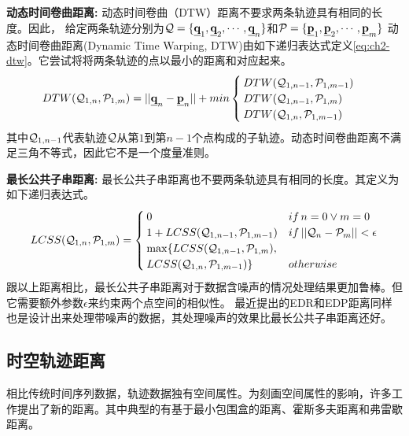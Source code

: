 \textbf{动态时间卷曲距离:}
动态时间卷曲（DTW）距离不要求两条轨迹具有相同的长度。因此，
给定两条轨迹分别为${\cal{Q}}=\{\emph{{\textbf{q}}}_{1},\emph{{\textbf{q}}}_{2},\cdots,\emph{{\textbf{q}}}_{n}\}$和${\cal{P}}=\{\emph{{\textbf{p}}}_1,\emph{{\textbf{p}}}_{2},\cdots,\emph{{\textbf{p}}}_{m}\}$
动态时间卷曲距离(Dynamic Time Warping, DTW)由如下递归表达式定义\ref{eq:ch2-dtw}。它尝试将将两条轨迹的点以最小的距离和对应起来。
\begin{equation}\label{eq:ch2-dtw}
DTW({\cal{Q}}_{1,n}, {\cal{P}}_{1,m})=||\emph{{\textbf{q}}}_{n}-\emph{{\textbf{p}}}_{n}||+min \begin{cases}
DTW({\cal{Q}}_{1,n-1}, {\cal{P}}_{1,m-1})  \\
DTW({\cal{Q}}_{1,n-1}, {\cal{P}}_{1,m})  \\
DTW({\cal{Q}}_{1,n}, {\cal{P}}_{1,m-1})
\end{cases}
\end{equation}
其中${\cal{Q}}_{1,n-1}$代表轨迹$\cal Q$从第$1$到第$n-1$个点构成的子轨迹。动态时间卷曲距离不满足三角不等式，因此它不是一个度量准则。

\textbf{最长公共子串距离:}
最长公共子串距离也不要两条轨迹具有相同的长度。其定义为如下递归表达式。
\begin{eqnarray}\label{eq:ch2-lcss}
LCSS({\cal{Q}}_{1,n}, {\cal{P}}_{1,m})= \begin{cases}
0 & if \, n=0 \lor m=0  \\
1+ LCSS({\cal{Q}}_{1,n-1}, {\cal{P}}_{1,m-1}) & if \,  ||{\cal{Q}}_{n}-{\cal{P}}_{m}||<\epsilon  \\
\max \{LCSS({\cal{Q}}_{1,n-1}, {\cal{P}}_{1,m}) ,\\LCSS({\cal{Q}}_{1,n}, {\cal{P}}_{1,m-1})\} & otherwise
\end{cases}
\end{eqnarray}
跟以上距离相比，最长公共子串距离对于数据含噪声的情况处理结果更加鲁棒。但它需要额外参数$\epsilon$来约束两个点空间的相似性。
最近提出的EDR和EDP距离同样也是设计出来处理带噪声的数据，其处理噪声的效果比最长公共子串距离还好。

\subsection{时空轨迹距离}
相比传统时间序列数据，轨迹数据独有空间属性。为刻画空间属性的影响，许多工作提出了新的距离。其中典型的有基于最小包围盒的距离、霍斯多夫距离和弗雷歇距离。

